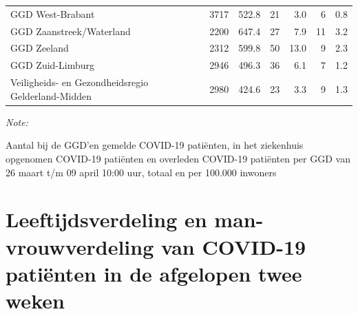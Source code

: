 \documentclass[
  english,
  man,floatsintext]{apa6}
\begin{document}
\begin{table}
\begin{threeparttable}
\begin{tabular}{lrrrrrr}
GGD West-Brabant & 3717 & 522.8 & 21 & 3.0 & 6 & 0.8\\
GGD Zaanstreek/Waterland & 2200 & 647.4 & 27 & 7.9 & 11 & 3.2\\
GGD Zeeland & 2312 & 599.8 & 50 & 13.0 & 9 & 2.3\\
GGD Zuid-Limburg & 2946 & 496.3 & 36 & 6.1 & 7 & 1.2\\
Veiligheids- en Gezondheidsregio Gelderland-Midden & 2980 & 424.6 & 23 & 3.3 & 9 & 1.3\\
\bottomrule
\end{tabular}
\begin{tablenotes}
\item \textit{Note: } 
\item Aantal bij de GGD’en gemelde COVID-19 patiënten, in het ziekenhuis opgenomen COVID-19 patiënten en overleden COVID-19 patiënten per GGD van 26 maart t/m 09 april 10:00 uur, totaal en per 100.000 inwoners
\end{tablenotes}
\end{threeparttable}
\endgroup{}
\end{table}

\newpage

\hypertarget{leeftijdsverdeling-en-man-vrouwverdeling-van-covid-19-patiuxebnten-in-de-afgelopen-twee-weken}{%
\section{Leeftijdsverdeling en man-vrouwverdeling van COVID-19 patiënten in de afgelopen twee weken}\label{leeftijdsverdeling-en-man-vrouwverdeling-van-covid-19-patiuxebnten-in-de-afgelopen-twee-weken}}
\end{document}
